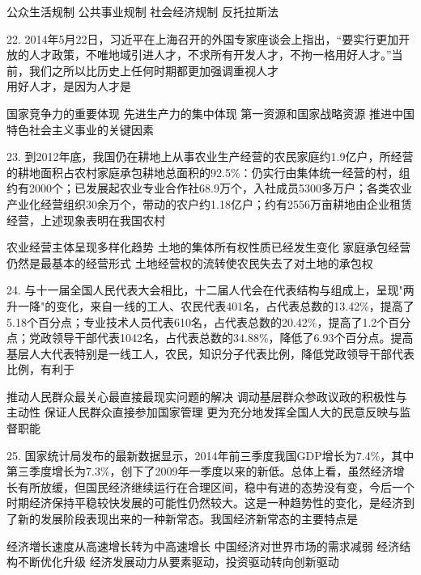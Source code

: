\begin{choices}
	 公众生活规制
	 公共事业规制
	 社会经济规制
	 反托拉斯法
\end{choices}
22. 2014年5月22日，习近平在上海召开的外国专家座谈会上指出，“要实行更加开放的人才政策，不唯地域引进人才，不求所有开发人才，不拘一格用好人才。”当前，我们之所以比历史上任何时期都更加强调重视人才\\用好人才，是因为人才是
\begin{choices}
	 国家竞争力的重要体现
	 先进生产力的集中体现
	 第一资源和国家战略资源
	 推进中国特色社会主义事业的关键因素
\end{choices}
23. 到2012年底，我国仍在耕地上从事农业生产经营的农民家庭约1.9亿户，所经营的耕地面积占农村家庭承包耕地总面积的92.5\%：仍实行由集体统一经营的村，组约有2000个；已发展起农业专业合作社68.9万个，入社成员5300多万户；各类农业产业化经营组织30余万个，带动的农户约1.18亿户；约有2556万亩耕地由企业租赁经营，上述现象表明在我国农村
\begin{choices}
	 农业经营主体呈现多样化趋势
	 土地的集体所有权性质已经发生变化
	 家庭承包经营仍然是最基本的经营形式
	 土地经营权的流转使农民失去了对土地的承包权
\end{choices}
24. 与十一届全国人民代表大会相比，十二届人代会在代表结构与组成上，呈现"两升一降"的变化，来自一线的工人、农民代表401名，占代表总数的13.42\%，提高了5.18个百分点；专业技术人员代表610名，占代表总数的20.42\%，提高了1.2个百分点；党政领导干部代表1042名，占代表总数的34.88\%，降低了6.93个百分点。提高基层人大代表特别是一线工人，农民，知识分子代表比例，降低党政领导干部代表比例，有利于
\begin{choices}
	 推动人民群众最关心最直接最现实问题的解决
	 调动基层群众参政议政的积极性与主动性
	 保证人民群众直接参加国家管理
	 更为充分地发挥全国人大的民意反映与监督职能
\end{choices}
25. 国家统计局发布的最新数据显示，2014年前三季度我国GDP增长为7.4\%，其中第三季度增长为7.3\%，创下了2009年一季度以来的新低。总体上看，虽然经济增长有所放缓，但国民经济继续运行在合理区间，稳中有进的态势没有变，今后一个时期经济保持平稳较快发展的可能性仍然较大。这是一种趋势性的变化，是经济到了新的发展阶段表现出来的一种新常态。我国经济新常态的主要特点是
\begin{choices}
	 经济増长速度从高速增长转为中高速增长
	 中国经济对世界市场的需求减弱
	 经济结构不断优化升级
	 经济发展动力从要素驱动，投资驱动转向创新驱动
\end{choices}
